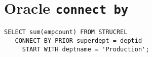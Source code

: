 \section{Oracle \texttt{connect by}}


\begin{verbatim}
SELECT sum(empcount) FROM STRUCREL
   CONNECT BY PRIOR superdept = deptid
     START WITH deptname = 'Production';
\end{verbatim}

